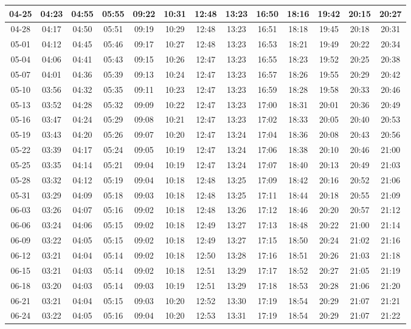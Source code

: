 \begin{footnotesize}
\begin{longtable}{c | c | c | c | c | c | c | c | c | c | c | c | c}
		04-25&04:23&04:55&05:55&09:22&10:31&12:48&13:23&16:50&18:16&19:42&20:15&20:27\\\hline
		04-28&04:17&04:50&05:51&09:19&10:29&12:48&13:23&16:51&18:18&19:45&20:18&20:31\\\hline
		05-01&04:12&04:45&05:46&09:17&10:27&12:48&13:23&16:53&18:21&19:49&20:22&20:34\\\hline
		05-04&04:06&04:41&05:43&09:15&10:26&12:47&13:23&16:55&18:23&19:52&20:25&20:38\\\hline
		05-07&04:01&04:36&05:39&09:13&10:24&12:47&13:23&16:57&18:26&19:55&20:29&20:42\\\hline
		05-10&03:56&04:32&05:35&09:11&10:23&12:47&13:23&16:59&18:28&19:58&20:33&20:46\\\hline
		05-13&03:52&04:28&05:32&09:09&10:22&12:47&13:23&17:00&18:31&20:01&20:36&20:49\\\hline
		05-16&03:47&04:24&05:29&09:08&10:21&12:47&13:23&17:02&18:33&20:05&20:40&20:53\\\hline
		05-19&03:43&04:20&05:26&09:07&10:20&12:47&13:24&17:04&18:36&20:08&20:43&20:56\\\hline
		05-22&03:39&04:17&05:24&09:05&10:19&12:47&13:24&17:06&18:38&20:10&20:46&21:00\\\hline
		05-25&03:35&04:14&05:21&09:04&10:19&12:47&13:24&17:07&18:40&20:13&20:49&21:03\\\hline
		05-28&03:32&04:12&05:19&09:04&10:18&12:48&13:25&17:09&18:42&20:16&20:52&21:06\\\hline
		05-31&03:29&04:09&05:18&09:03&10:18&12:48&13:25&17:11&18:44&20:18&20:55&21:09\\\hline
		06-03&03:26&04:07&05:16&09:02&10:18&12:48&13:26&17:12&18:46&20:20&20:57&21:12\\\hline
		06-06&03:24&04:06&05:15&09:02&10:18&12:49&13:27&17:13&18:48&20:22&21:00&21:14\\\hline
		06-09&03:22&04:05&05:15&09:02&10:18&12:49&13:27&17:15&18:50&20:24&21:02&21:16\\\hline
		06-12&03:21&04:04&05:14&09:02&10:18&12:50&13:28&17:16&18:51&20:26&21:03&21:18\\\hline
		06-15&03:21&04:03&05:14&09:02&10:18&12:51&13:29&17:17&18:52&20:27&21:05&21:19\\\hline
		06-18&03:20&04:03&05:14&09:03&10:19&12:51&13:29&17:18&18:53&20:28&21:06&21:20\\\hline
		06-21&03:21&04:04&05:15&09:03&10:20&12:52&13:30&17:19&18:54&20:29&21:07&21:21\\\hline
		06-24&03:22&04:05&05:16&09:04&10:20&12:53&13:31&17:19&18:54&20:29&21:07&21:22\\\hline

\end{longtable}
\end{footnotesize}
